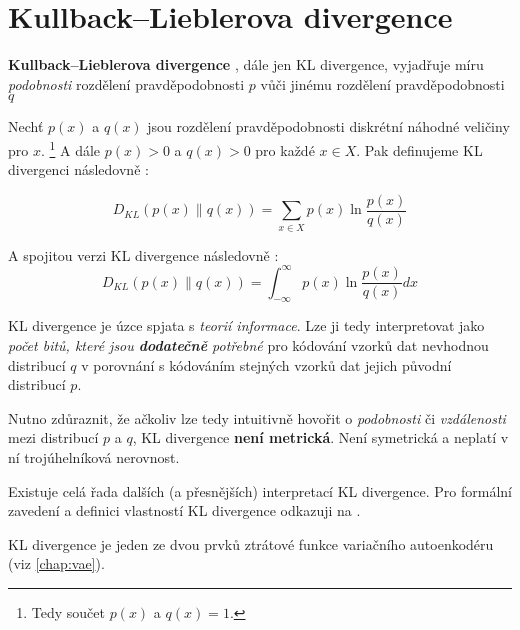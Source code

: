 \section{Kullback–Lieblerova divergence}
\label{sec:kl_divergence}

\textbf{Kullback–Lieblerova divergence} \cite{Kullback1951}, dále jen KL divergence, vyjadřuje míru \emph{podobnosti} rozdělení pravděpodobnosti $p$ vůči jinému rozdělení pravděpodobnosti $q$

Nechť $p(x)$ a $q(x)$ jsou rozdělení pravděpodobnosti diskrétní náhodné veličiny pro $x$. \footnote{Tedy součet $p(x)$ a $q(x) = 1$.}
A dále $p(x) > 0$ a $q(x) > 0$ pro každé $x \in X$. Pak definujeme KL divergenci následovně \cite{Murphy2022}:

\begin{equation}
    D_{KL}(p(x) \| q(x)) = \sum_{x \in X}^{}p(x)\ln{\frac{p(x)}{q(x)}}
\end{equation}

A spojitou verzi KL divergence následovně \cite{Murphy2022}:
\begin{equation}
    D_{KL}(p(x) \| q(x)) = \int_{-\infty}^{\infty}p(x)\ln{\frac{p(x)}{q(x)}}dx 
\end{equation}

KL divergence je úzce spjata s \emph{teorií informace}.
Lze ji tedy interpretovat jako \emph{počet bitů, které jsou \textbf{dodatečně} potřebné} pro kódování vzorků dat nevhodnou distribucí $q$ v porovnání s kódováním stejných vzorků dat jejich původní distribucí $p$. \cite{Doersch2021}

Nutno zdůraznit, že ačkoliv lze tedy intuitivně hovořit o \emph{podobnosti} či \emph{vzdálenosti} mezi distribucí $p$ a $q$, KL divergence \textbf{není metrická}. Není symetrická a neplatí v ní trojúhelníková nerovnost. \cite{Phillips2021}

Existuje celá řada dalších (a přesnějších) interpretací KL divergence. Pro formální zavedení a definici vlastností KL divergence odkazuji na \cite[kap. 5.1]{Murphy2023}.

KL divergence je jeden ze dvou prvků ztrátové funkce variačního autoenkodéru (viz \autoref{chap:vae}).
